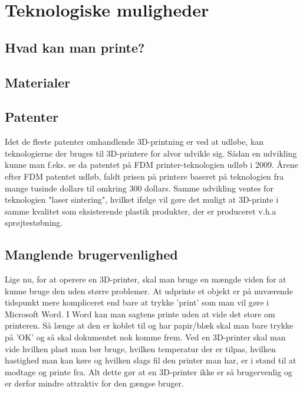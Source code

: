 \section{Teknologiske muligheder} %

\subsection{Hvad kan man printe?} %


\subsection{Materialer} %
\label{sub:materialer}


\subsection{Patenter} %
\label{sub:patenter}

Idet de fleste patenter omhandlende 3D-printning er ved at udløbe, kan teknologierne der bruges til 3D-printere for alvor udvikle sig. Sådan en udvikling kunne man f.eks. se da patentet på FDM printer-teknologien udløb i 2009. \autocite{manyika_disruptive_2013} Årene efter FDM patentet udløb, faldt prisen på printere baseret på teknologien fra mange tusinde dollars til omkring 300 dollars. \autocite{mims_3d_2013} Samme udvikling ventes for teknologien "laser sintering", hvilket ifølge \autocite{mims_3d_2013} vil gøre det muligt at 3D-printe i samme kvalitet som eksisterende plastik produkter, der er produceret v.h.a sprøjtestøbning.


\subsection{Manglende brugervenlighed} %
\label{sub:manglende_brugervenlighed}

Lige nu, for at operere en 3D-printer, skal man bruge en mængde viden for at kunne bruge den uden større problemer. At udprinte et objekt er på nuværende tidspunkt mere kompliceret end bare at trykke ’print’ som man vil gøre i Microsoft Word. I Word kan man sagtens printe uden at vide det store om printeren. Så længe at den er koblet til og har papir/blæk skal man bare trykke på ’OK’ og så skal dokumentet nok komme frem. 
Ved en 3D-printer skal man vide hvilken plast man bør bruge, hvilken temperatur der er tilpas, hvilken hastighed man kan køre og hvilken slags fil den printer man har, er i stand til at modtage og printe fra.
Alt dette gør at en 3D-printer ikke er så brugervenlig og er derfor mindre attraktiv for den gængse bruger.




